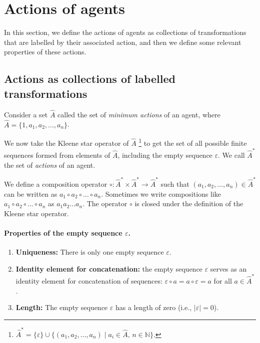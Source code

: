 \section{Actions of agents}

In this section, we define the actions of agents as collections of transformations that are labelled by their associated action, and then we define some relevant properties of these actions.

\subsection{Actions as collections of labelled transformations}

Consider a set $\hat{A}$ called the set of \emph{minimum actions} of an agent, where $\hat{A} = \{1, a_{1}, a_{2}, \dots, a_{n}\}$.

We now take the Kleene star operator of $\hat{A}$ \footnote{
	$\hat{A}^{\ast} = \{ \varepsilon \} \cup \{ (a_1, a_2, \dots, a_n) \mid a_i \in \hat{A}, \, n \in \mathbb{N} \}$.
} to get the set of all possible finite sequences formed from elements of $\hat{A}$, including the empty sequence $\varepsilon$.
We call $\hat{A}^{\ast}$ the set of \emph{actions} of an agent.

We define a composition operator $\circ: \hat{A}^{\ast} \times \hat{A}^{\ast} \to \hat{A}^{\ast}$ such that $(a_1, a_2, \dots, a_n) \in \hat{A}^{\ast}$ can be written as $a_1 \circ a_2 \circ \dots \circ a_n$.
Sometimes we write compositions like $a_1 \circ a_2 \circ \dots \circ a_n$ as $a_1 a_2 \dots a_n$.
The operator $\circ$ is closed under the definition of the Kleene star operator.

\paragraph{Properties of the empty sequence $\varepsilon$.}
\begin{enumerate}
	\item \textbf{Uniqueness:} There is only one empty sequence $\varepsilon$.
	\item \textbf{Identity element for concatenation:} the empty sequence $\varepsilon$ serves as an identity element for concatenation of sequences:
	      $\varepsilon \circ a = a \circ \varepsilon = a$ for all $a \in \hat{A}^{\ast}$.
	\item \textbf{Length:} The empty sequence $\varepsilon$ has a length of zero (i.e., $|\varepsilon| = 0$).
\end{enumerate}

